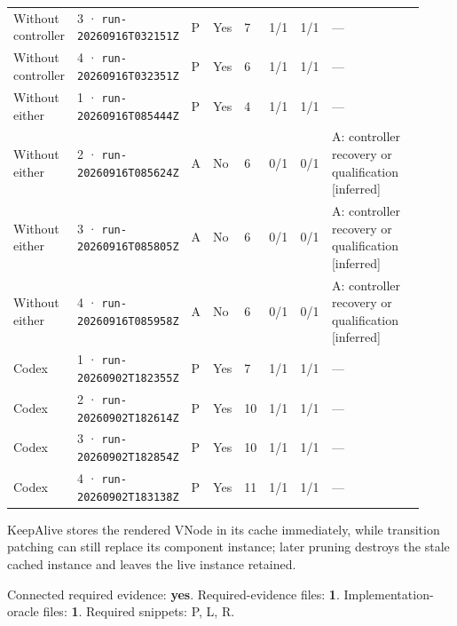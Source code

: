 \begin{landscape}
\begin{longtable}{@{}L{0.11\linewidth}L{0.16\linewidth}*{1}{L{0.022\linewidth}}L{0.05\linewidth}L{0.045\linewidth}L{0.08\linewidth}L{0.085\linewidth}L{0.368\linewidth}@{}}
Without controller & 3 · \texttt{run-20260916\allowbreak T032151Z} & P & Yes & 7 & 1/1 & 1/1 & --- \\
Without controller & 4 · \texttt{run-20260916\allowbreak T032351Z} & P & Yes & 6 & 1/1 & 1/1 & --- \\
Without either & 1 · \texttt{run-20260916\allowbreak T085444Z} & P & Yes & 4 & 1/1 & 1/1 & --- \\
Without either & 2 · \texttt{run-20260916\allowbreak T085624Z} & A & No & 6 & 0/1 & 0/1 & A: controller recovery or qualification [inferred] \\
Without either & 3 · \texttt{run-20260916\allowbreak T085805Z} & A & No & 6 & 0/1 & 0/1 & A: controller recovery or qualification [inferred] \\
Without either & 4 · \texttt{run-20260916\allowbreak T085958Z} & A & No & 6 & 0/1 & 0/1 & A: controller recovery or qualification [inferred] \\
Codex & 1 · \texttt{run-20260902\allowbreak T182355Z} & P & Yes & 7 & 1/1 & 1/1 & --- \\
Codex & 2 · \texttt{run-20260902\allowbreak T182614Z} & P & Yes & 10 & 1/1 & 1/1 & --- \\
Codex & 3 · \texttt{run-20260902\allowbreak T182854Z} & P & Yes & 10 & 1/1 & 1/1 & --- \\
Codex & 4 · \texttt{run-20260902\allowbreak T183138Z} & P & Yes & 11 & 1/1 & 1/1 & --- \\
\end{longtable}
\endgroup
\end{landscape}

\label{sec:vuejs-vue-9842}

KeepAlive stores the rendered VNode in its cache immediately, while transition patching can still replace its component instance; later pruning destroys the stale cached instance and leaves the live instance retained.

Connected required evidence: \textbf{yes}. Required-evidence files: \textbf{1}. Implementation-oracle files: \textbf{1}. Required snippets: P, L, R.

